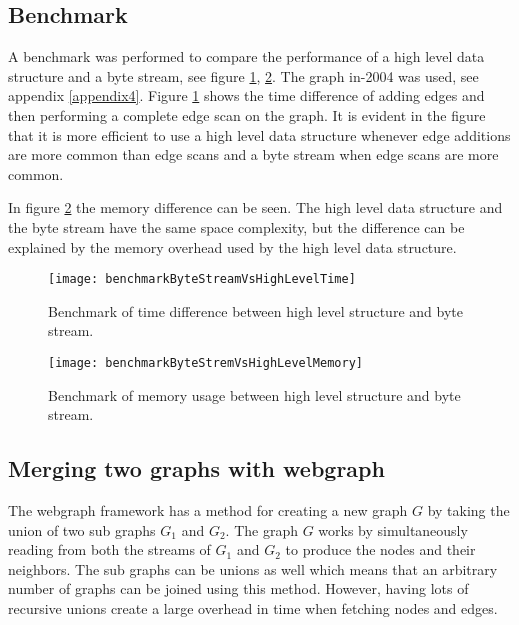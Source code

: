 \subsection{Benchmark}
A benchmark was performed to compare the performance of a high level data structure and a byte stream, see figure \ref{fig:benchmarkByteStreamVsHighLevelTime}, \ref{fig:benchmarkByteStremVsHighLevelMemory}. The graph in-2004 was used, see appendix \ref{appendix4}. Figure \ref{fig:benchmarkByteStreamVsHighLevelTime} shows the time difference of adding edges and then performing a complete edge scan on the graph. It is evident in the figure that it is more efficient to use a high level data structure whenever edge additions are more common than edge scans and a byte stream when edge scans are more common. 

In figure \ref{fig:benchmarkByteStremVsHighLevelMemory} the memory difference can be seen. The high level data structure and the byte stream have the same space complexity, but the difference can be explained by the memory overhead used by the high level data structure. 

\begin{figure}[h]
\centering
\texttt{[image: benchmarkByteStreamVsHighLevelTime]}    
\captionsetup{justification=centering}
\caption {Benchmark of time difference between high level structure and byte stream. }
\label{fig:benchmarkByteStreamVsHighLevelTime}
\end{figure}

\begin{figure}[h]
\centering
\texttt{[image: benchmarkByteStremVsHighLevelMemory]}    
\captionsetup{justification=centering}
\caption {Benchmark of memory usage between high level structure and byte stream. }
\label{fig:benchmarkByteStremVsHighLevelMemory}
\end{figure}


\subsection{Merging two graphs with webgraph}
The webgraph framework has a method for creating a new graph $G$ by taking the union of two sub graphs $G_1$ and $G_2$. The graph $G$ works by simultaneously reading from both the streams of $G_1$ and $G_2$ to produce the nodes and their neighbors. The sub graphs can be unions as well which means that an arbitrary number of graphs can be joined using this method. However, having lots of recursive unions create a large overhead in time when fetching nodes and edges. \cite{webgraph} 

